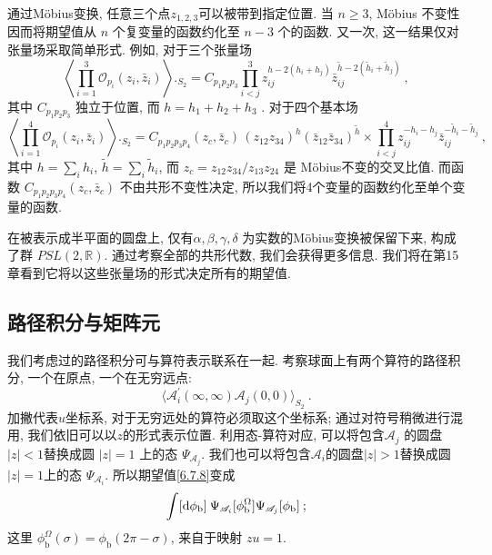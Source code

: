 通过M\"{o}bius变换, 任意三个点$z_{1,2,3}$可以被带到指定位置. 当 $n \geq 3$, M\"{o}bius 不变性因而将期望值从 $n$ 个复变量的函数约化至 $n-3$ 个的函数. 
又一次, 这一结果仅对张量场采取简单形式. 例如, 对于三个张量场
\begin{equation}
	\left\langle\prod_{i=1}^{3} \mathcal{O}_{p_{i}}(z_{i}, \bar{z}_{i})\right\rangle\bigg._{\!\!S_{2}}
	=C_{p_{1} p_{2} p_{3}} 
	\prod_{i<j}^{3} z_{i j}^{h-2(h_{i}+h_{j})} \bar{z}_{i j}^{\tilde{h}-2(\tilde{h}_{i}+\tilde{h}_{j})} \:, \label{6.7.6}
\end{equation}
其中 $C_{p_{1} p_{2} p_{3}}$ 独立于位置, 而 $h=h_{1}+h_{2}+h_{3} $ . 对于四个基本场
\begin{equation}
	\left\langle\prod_{i=1}^{4} \mathcal{O}_{p_{i}}(z_{i}, \bar{z}_{i})\right\rangle\bigg._{\!\!S_{2}}
	=C_{p_{1} p_{2} p_{3} p_{4}}(z_{c}, \bar{z}_{c}) \, (z_{12} z_{34})^{h}(\bar{z}_{12} \bar{z}_{34})^{\tilde{h}} \times 
	\prod_{i<j}^{4} z_{i j}^{-h_{i}-h_{j}} \bar{z}_{i j}^{-\tilde{h}_{i}-\tilde{h}_{j}} \:, \label{6.7.7}
\end{equation}
其中 $h=\sum_{i} h_{i}$, $\tilde{h}=\sum_{i} \tilde{h}_{i}$, 而 $z_{c}=z_{12} z_{34} / z_{13} z_{24}$ 是 M\"{o}bius不变的交叉比值. 
而函数 $C_{p_{1} p_{2} p_{3} p_{4}}(z_{c}, \bar{z}_{c})$ 不由共形不变性决定, 所以我们将4个变量的函数约化至单个变量的函数.

在被表示成半平面的圆盘上, 仅有$\alpha, \beta, \gamma, \delta$ 为实数的M\"{o}bius变换被保留下来, 构成了群 $P S L(2, \mathds{R})$. 
通过考察全部的共形代数, 我们会获得更多信息. 我们将在第15章看到它将以这些张量场的形式决定所有的期望值.

\subsection*{路径积分与矩阵元}
我们考虑过的路径积分可与算符表示联系在一起. 考察球面上有两个算符的路径积分, 一个在原点, 一个在无穷远点:
\begin{equation}
	\bigl\langle\mathscr{A}_{i}^{\prime}(\infty, \infty) \mathscr{A}_{j}(0,0)\bigr\rangle_{S_{2}} \:. \label{6.7.8}
\end{equation}
加撇代表$u$坐标系, 对于无穷远处的算符必须取这个坐标系; 通过对符号稍微进行混用, 我们依旧可以以$z$的形式表示位置. 
利用态-算符对应, 可以将包含$\mathscr{A}_{j}$ 的圆盘$\lvert z\rvert<1$替换成圆 $|z|=1$ 上的态 $\Psi_{\mathscr{A}_{j}}$. 
我们也可以将包含$\mathscr{A}_{i}$的圆盘$\lvert z\rvert>1$替换成圆$|z|=1 $上的态 $\Psi_{\mathscr{A}_{i}}$. 
所以期望值\eqref{6.7.8}变成
\begin{equation}
	\int[\mathrm{d} \phi_{\mathrm{b}}]\: \Psi_{\mathscr{A}_{i}}[\phi_{\mathrm{b}}^{\Omega}] 
	\Psi_{\mathscr{A}_{j}}[\phi_{\mathrm{b}}] \:; \label{6.7.9}
\end{equation}
这里 $\phi_{\mathrm{b}}^{\Omega}(\sigma)=\phi_{\mathrm{b}}(2 \pi-\sigma)$, 来自于映射 $z u=1$.


